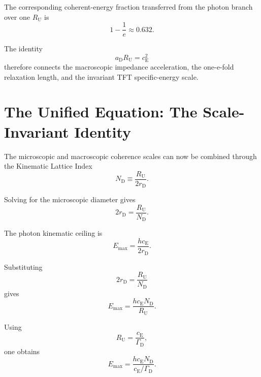 The corresponding coherent-energy fraction transferred from the photon branch
over one $R_{\mathrm U}$ is
\begin{equation}
    1-\frac{1}{e}
    \approx
    0.632.
\end{equation}

The identity
\begin{equation}
    a_{\mathrm D}R_{\mathrm U}
    =
    c_{\mathrm E}^{2}
\end{equation}
therefore connects the macroscopic impedance acceleration, the one-e-fold
relaxation length, and the invariant TFT specific-energy scale.


\section{The Unified Equation: The Scale-Invariant Identity}

The microscopic and macroscopic coherence scales can now be combined through
the Kinematic Lattice Index
\begin{equation}
    \boxed{
    N_{\mathrm D}
    \equiv
    \frac{
        R_{\mathrm U}
    }{
        2r_{\mathrm D}
    }.
    }
\end{equation}

Solving for the microscopic diameter gives
\begin{equation}
    2r_{\mathrm D}
    =
    \frac{
        R_{\mathrm U}
    }{
        N_{\mathrm D}
    }.
\end{equation}

The photon kinematic ceiling is
\begin{equation}
    E_{\mathrm{max}}
    =
    \frac{
        hc_{\mathrm E}
    }{
        2r_{\mathrm D}
    }.
\end{equation}

Substituting
\begin{equation}
    2r_{\mathrm D}
    =
    \frac{
        R_{\mathrm U}
    }{
        N_{\mathrm D}
    }
\end{equation}
gives
\begin{equation}
    E_{\mathrm{max}}
    =
    \frac{
        hc_{\mathrm E}N_{\mathrm D}
    }{
        R_{\mathrm U}
    }.
\end{equation}

Using
\begin{equation}
    R_{\mathrm U}
    =
    \frac{
        c_{\mathrm E}
    }{
        \Gamma_{\mathrm D}
    },
\end{equation}
one obtains
\begin{equation}
    E_{\mathrm{max}}
    =
    \frac{
        hc_{\mathrm E}N_{\mathrm D}
    }{
        c_{\mathrm E}/\Gamma_{\mathrm D}
    }.
\end{equation}

